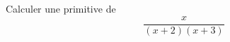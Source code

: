 Calculer une primitive de
\begin{displaymath}
 \frac{x}{(x+2)(x+3)}
\end{displaymath}
\bigskip \bigskip \bigskip